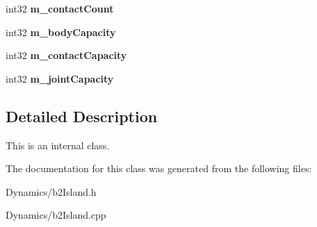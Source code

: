 \begin{DoxyCompactItemize}
$$int32 {\bfseries m\+\_\+contact\+Count}
\item 
\mbox{\label{classb2Island_a5ea371889bb93fb6387ff2ab427191ed}} 
int32 {\bfseries m\+\_\+body\+Capacity}
\item 
\mbox{\label{classb2Island_a1a65b8fc8256ca443f85e6ae6f2d841a}} 
int32 {\bfseries m\+\_\+contact\+Capacity}
\item 
\mbox{\label{classb2Island_a9b6e63c89307d469e1075585d65a9bbb}} 
int32 {\bfseries m\+\_\+joint\+Capacity}
\end{DoxyCompactItemize}


\subsection{Detailed Description}
This is an internal class. 

The documentation for this class was generated from the following files\+:\begin{DoxyCompactItemize}
\item 
Dynamics/b2\+Island.\+h\item 
Dynamics/b2\+Island.\+cpp\end{DoxyCompactItemize}
